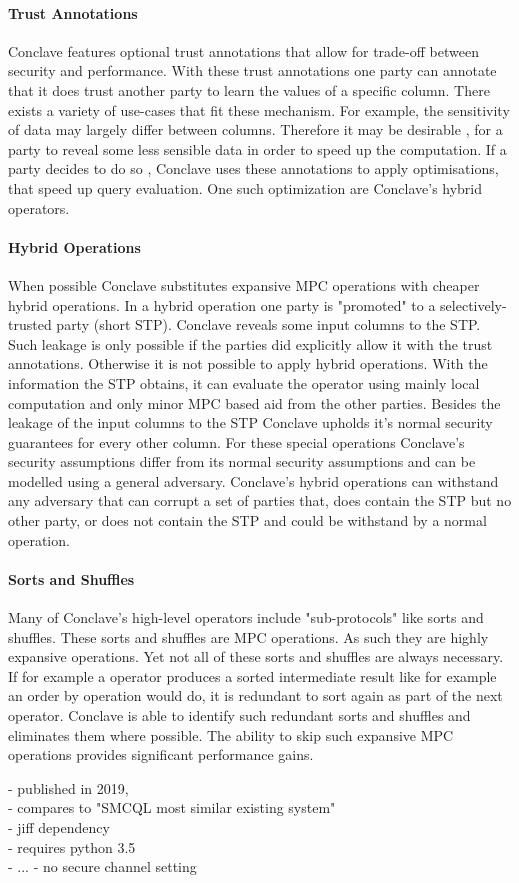 \label{Trust_label}	
\paragraph{Trust Annotations}
Conclave features optional trust annotations that allow for trade-off between security and performance. With these trust annotations one party can annotate that it does trust another party to learn the values of a specific column. There exists a variety of use-cases that fit these mechanism. For example, the sensitivity of data may largely differ between columns. Therefore it may be desirable , for a party to reveal some less sensible data in order to speed up the computation. If a party decides to do so , Conclave uses these annotations to apply optimisations, that speed up query evaluation. One such optimization are Conclave's hybrid operators.
\paragraph{Hybrid Operations}
When possible Conclave substitutes expansive MPC operations with cheaper hybrid operations. In a hybrid operation one party is "promoted" to a selectively-trusted party (short STP). Conclave reveals some input columns to the STP. Such leakage is only possible if the parties did explicitly allow it with the trust annotations. Otherwise it is not possible to apply hybrid operations. With the information the STP obtains, it can evaluate the operator using mainly local computation and only minor MPC based aid from the other parties. Besides the leakage of the input columns to the STP Conclave upholds it's normal security guarantees for every other column. For these special operations Conclave's security assumptions differ from its normal security assumptions and can be modelled using a general adversary. Conclave's hybrid operations can withstand any adversary that can corrupt a set of parties that, does contain the STP but no other party, or does not contain the STP and could be withstand by a normal operation. 
\paragraph{Sorts and Shuffles}
Many of Conclave's high-level operators include "sub-protocols" like sorts and shuffles. These sorts and shuffles are MPC operations. As such they are highly expansive operations. Yet not all of these sorts and shuffles are always necessary. If for example a operator produces a sorted intermediate result like for example an order by operation would do, it is redundant to sort again as part of the next operator. Conclave is able to identify such redundant sorts and shuffles and eliminates them where possible. The ability to skip such expansive MPC operations provides significant performance gains.

- published in 2019,\\
- compares to "SMCQL most similar existing system"\\
- jiff dependency \\
- requires python 3.5 \\
- ... 
- no secure channel setting\\